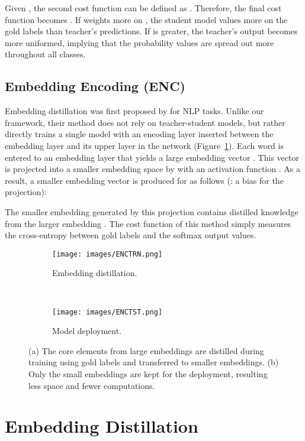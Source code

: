 \documentclass{article}
\begin{document}
\noindent Given , the second cost function can be defined as .
Therefore, the final cost function becomes .
If  weights more on , the student model values more on the gold labels than teacher's predictions.
If  is greater, the teacher's output becomes more uniformed, implying that the probability values are spread out more throughout all classes.

\subsection{Embedding Encoding (ENC)}
\label{ssec:enc}

Embedding distillation was first proposed by \cite{mou2016distilling} for NLP tasks.
Unlike our framework, their method does not rely on teacher-student models, but rather directly trains a single model with an encoding layer inserted between the embedding layer and its upper layer in the network (Figure~\ref{fig:embedding-encoding-distill}).
Each word  is entered to an embedding layer  that yields a large embedding vector .
This vector is projected into a smaller embedding space by  with an activation function .
As a result, a smaller embedding vector  is produced for  as follows (: a bias for the projection):

The smaller embedding  generated by this projection contains distilled knowledge from the larger embedding .
The cost function of this method simply measures the cross-entropy between gold labels and
the softmax output values.


\begin{figure}[ht!]
	\centering
	\begin{subfigure}[b]{0.23\textwidth}
		\centering
\texttt{[image: images/ENCTRN.png]}
		\caption{Embedding distillation.}
		\label{fig:embedding-encoding-distill}
	\end{subfigure}~ 
	\begin{subfigure}[b]{0.23\textwidth}
		\centering
\texttt{[image: images/ENCTST.png]}
		\caption{Model deployment.}
		\label{fig:embedding-encoding-deploy}
	\end{subfigure}\caption{(a) The core elements from large embeddings are distilled during training using gold labels and transferred to smaller embeddings. (b) Only the small embeddings are kept for the deployment, resulting less space and fewer computations.}
	\label{fig:embedding-encoding}
\end{figure} 

\section{Embedding Distillation}
\label{sec:distillation}
\end{document}
